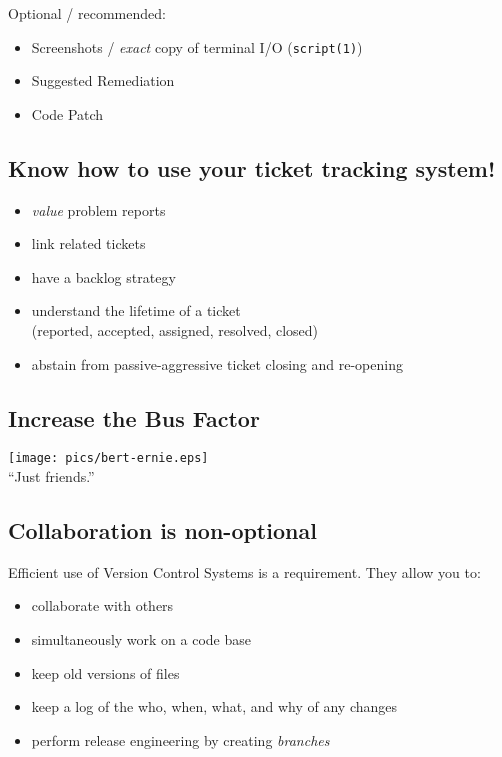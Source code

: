 \documentclass[xga]{xdvislides}
\begin{document}
Optional / recommended:
\begin{itemize}
	\item Screenshots / {\em exact} copy of terminal I/O ({\tt script(1)})
	\item Suggested Remediation
	\item Code Patch
\end{itemize}

\subsection{Know how to use your ticket tracking system!}
\begin{itemize}
	\item {\em value} problem reports
	\item link related tickets
	\item have a backlog strategy
	\item understand the lifetime of a ticket \\
		(reported, accepted, assigned, resolved, closed)
	\item abstain from passive-aggressive ticket
		closing and re-opening
\end{itemize}

\subsection{Increase the Bus Factor}
\vspace*{\fill}
\begin{center}
	\texttt{[image: pics/bert-ernie.eps]} \\
	\small
	``Just friends.''
\end{center}
\vspace*{\fill}

\subsection{Collaboration is non-optional}
Efficient use of Version Control Systems is a
requirement.  They allow you to:

\begin{itemize}
        \item collaborate with others
        \item simultaneously work on a code base
        \item keep old versions of files
        \item keep a log of the who, when, what, and why of any changes
        \item perform release engineering by creating {\em branches}
\end{itemize}
\end{document}
